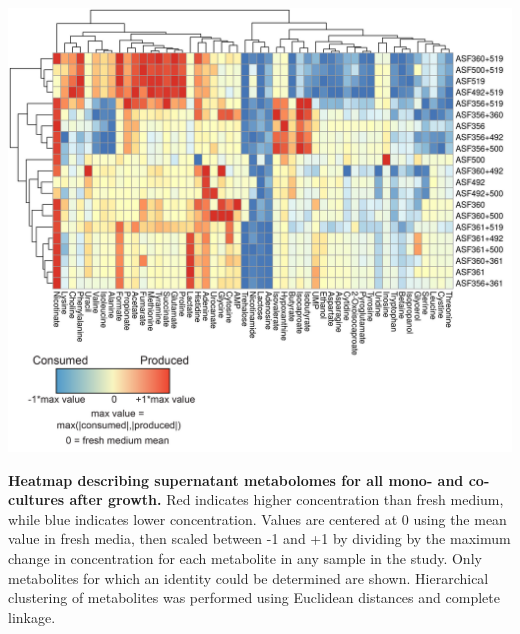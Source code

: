 \documentclass[11pt,onecolumn,notitlepage,openany,twoside]{book}
\begin{document}
\begin{refsection}
\begin{suppfigure*}
\centering
\includegraphics[width=\textwidth]{ch2_figS1}
\caption[Heatmap describing supernatant metabolomes for all mono- and co-cultures after growth.]{\textbf{Heatmap describing supernatant metabolomes for all mono- and co-cultures after growth.} Red indicates higher concentration than fresh medium, while blue indicates lower concentration. Values are centered at 0 using the mean value in fresh media, then scaled between -1 and +1 by dividing by the maximum change in concentration for each metabolite in any sample in the study. Only metabolites for which an identity could be determined are shown. Hierarchical clustering of metabolites was performed using Euclidean distances and complete linkage.}
\end{suppfigure*}


\end{refsection}
\end{document}
